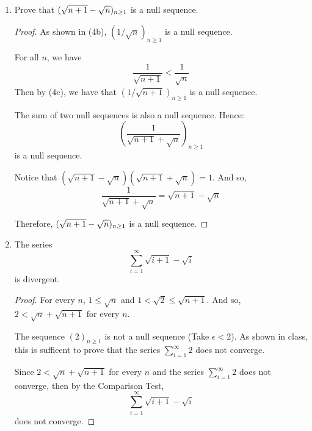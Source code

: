 \documentclass[12pt, letterpaper]{article}
\begin{document}
\begin{enumerate}[label=\bfseries4\alph*)]
Then $\seq{y}{n}$ is a null sequence.

\begin{proof}
	Since $\seq{x}{n}$ is a null sequence, for all $\epsilon > 0$, there is an
	$N$ such that for all $n \geq N$, $|x_n| < \epsilon$. 

	For all $n$, $|y_n| \leq |x_n|$. Then for all $\epsilon > 0$, there is 
	an $N$ such that for all $n \geq N$, $|y_n| \leq |x_n| < \epsilon$.

	Hence, $\seq{y}{n}$ is a null sequence.
\end{proof}

\item Prove that $(\sqrt{n+1} - \sqrt{n})_{n \geq 1}$ is a null sequence.

\begin{proof}
	As shown in (4b), $({1/\sqrt{n}})_{n\geq1}$ is a null sequence. 

	For all $n$, we have \[\frac{1}{\sqrt{n+1}} < \frac{1}{\sqrt{n}}\]
	Then by (4c), we have that $\left(1/\sqrt{n+1}\right)_{n\geq1}$ is a null sequence. 

	The sum of two null sequences is also a null sequence. Hence:
	\[ \left(\frac{1}{\sqrt{n+1} + \sqrt{n}}\right)_{n \geq 1}\]
	is a null sequence. 

	Notice that $(\sqrt{n+1} - \sqrt{n}) (\sqrt{n+1} + \sqrt{n}) = 1$. 
	And so, \[ \frac{1}{\sqrt{n+1} + \sqrt{n}} = \sqrt{n+1} - \sqrt{n} \]

	Therefore, $(\sqrt{n+1} - \sqrt{n})_{n \geq 1}$ is a null sequence.
\end{proof}

\item The series \[\sum_{i=1}^{\infty} \sqrt{i+1} - \sqrt{i} \]
is divergent.

\begin{proof}
	For every $n$, $1 \leq \sqrt{n}$ and $1 < \sqrt{2} \leq \sqrt{n+1}$. And so, 
	$2 < \sqrt{n} + \sqrt{n+1}$ for every $n$.

	The sequence $(2)_{n \geq 1}$ is not a null sequence (Take $\epsilon < 2$).
	As shown in class, this is sufficent to prove that the series $\sum_{i=1}^{\infty} 2$
	does not converge.

	Since $2 < \sqrt{n} + \sqrt{n+1}$ for every $n$ and the series 
	$\sum_{i=1}^{\infty} 2$ does not converge, then by the Comparison Test,
	\[\sum_{i=1}^{\infty} \sqrt{i+1} - \sqrt{i} \] does not converge.


\end{proof}
\end{enumerate}
\end{document}
